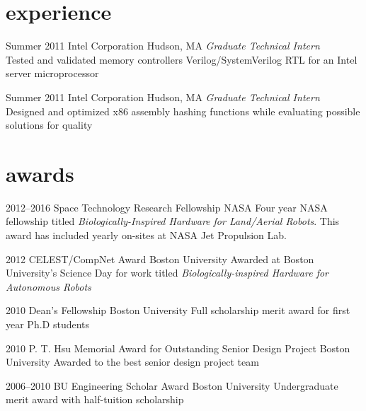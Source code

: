 \documentclass[]{friggeri-cv} %
\begin{document}
\section{experience}


\begin{entrylist}


\entry
{Summer 2011}
{Intel Corporation}
{Hudson, MA}
{\emph{Graduate Technical Intern} \\
  Tested and validated memory controllers Verilog/SystemVerilog RTL for an Intel server microprocessor
}

\entry
{Summer 2011}
{Intel Corporation}
{Hudson, MA}
{\emph{Graduate Technical Intern} \\
  Designed and optimized x86 assembly hashing functions while evaluating possible solutions for quality
}


\end{entrylist}


\section{awards}

\begin{entrylist}


\entry
{2012--2016}
{Space Technology Research Fellowship}
{NASA}
{Four year NASA fellowship titled \emph{Biologically-Inspired Hardware for Land/Aerial Robots}. This award has included yearly on-sites at NASA Jet Propulsion Lab.}

\entry
{2012}
{CELEST/CompNet Award}
{Boston University}
{Awarded at Boston University's Science Day for work titled \emph{Biologically-inspired Hardware for Autonomous Robots}}

\entry
{2010}
{Dean's Fellowship}
{Boston University}
{Full scholarship merit award for first year Ph.D students}

\entry
{2010}
{P. T. Hsu Memorial Award for Outstanding Senior Design Project}
{Boston University}
{Awarded to the best senior design project team}

\entry
{2006--2010}
{BU Engineering Scholar Award}
{Boston University}
{Undergraduate merit award with half-tuition scholarship}


\end{entrylist}
\end{document}
